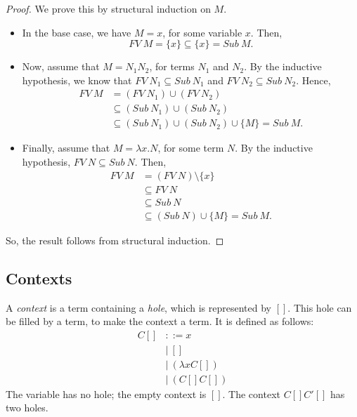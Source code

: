\documentclass[a4paper, openany]{memoir}
\theoremstyle{definition}
\begin{document}
    \begin{proof}
        We prove this by structural induction on $M$.
        \begin{itemize}
            \item In the base case, we have $M = x$, for some variable $x$. Then,
            \[FV \ M = \{x\} \subseteq \{x\} = Sub \ M.\]

            \item Now, assume that $M = N_1 N_2$, for terms $N_1$ and $N_2$. By the inductive hypothesis, we know that $FV \ N_1 \subseteq Sub \ N_1$ and $FV \ N_2 \subseteq Sub \ N_2$. Hence,
            \begin{align*}
                FV \ M &= (FV \ N_1) \cup (FV \ N_2) \\
                &\subseteq (Sub \ N_1) \cup (Sub \ N_2) \\
                &\subseteq (Sub \ N_1) \cup (Sub \ N_2) \cup \{M\} = Sub \ M.
            \end{align*}

            \item Finally, assume that $M = \lambda x. N$, for some term $N$. By the inductive hypothesis, $FV \ N \subseteq Sub \ N$. Then,
            \begin{align*}
                FV \ M &= (FV \ N) \setminus \{x\} \\
                &\subseteq FV \ N \\
                &\subseteq Sub \ N \\
                &\subseteq (Sub \ N) \cup \{M\} = Sub \ M.
            \end{align*}
        \end{itemize}
        So, the result follows from structural induction.
    \end{proof}

    \subsection{Contexts}
    A \emph{context} is a term containing a \emph{hole}, which is represented by $[]$. This hole can be filled by a term, to make the context a term. It is defined as follows:
    \begin{align*}
        C[] &::= x \\
        &| \ [] \\
        &| \ (\lambda x C[]) \\
        &| \ (C[] C[])
    \end{align*}
    The variable has no hole; the empty context is $[]$. The context $C[] C'[]$ has two holes. 
    
\end{document}
